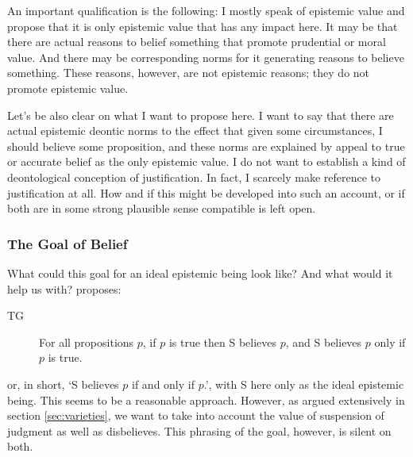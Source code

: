\documentclass[12pt,numbers=noenddot]{scrartcl}
\begin{document}
An important qualification is the following: I mostly speak of epistemic value and propose that it is only epistemic value that has any impact here. It may be that there are actual reasons to belief something that promote prudential or moral value. And there may be corresponding norms for it generating reasons to believe something. These reasons, however, are not epistemic reasons; they do not promote epistemic value.

Let’s be also clear on what I want to propose here. I want to say that there are actual epistemic deontic norms to the effect that given some circumstances, I should believe some proposition, and these norms are explained by appeal to true or accurate belief as the only epistemic value. I do not want to establish a kind of deontological conception of justification. In fact, I scarcely make reference to justification at all. How and if this might be developed into such an account, or if both are in some strong plausible sense compatible is left open.

\subsubsection{The Goal of Belief}\label{sec:goalofbelief}

What could this goal for an ideal epistemic being look like? And what would it help us with? \textcite[157]{David2001-DAVTAT-7} proposes:

\begin{description}
    \item[TG] For all propositions $p$, if $p$ is true then S believes $p$, and S believes $p$ only if $p$ is true.
\end{description}

or, in short, ‘S believes $p$ if and only if $p$.’, with S here only as the ideal epistemic being. This seems to be a reasonable approach. However, as argued extensively in section \ref{sec:varieties}, we want to take into account the value of suspension of judgment as well as disbelieves. This phrasing of the goal, however, is silent on both. 
\end{document}
